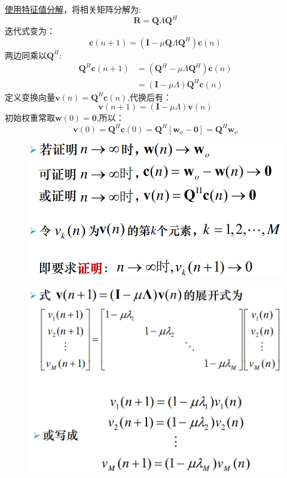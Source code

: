 \documentclass[UTF8]{ctexart} %
\begin{document}
			\uline{使用特征值分解}，将相关矩阵分解为:
			\[\textbf{R} = \textbf{Q}\Lambda\textbf{Q}^H\]
			迭代式变为：
			\[\textbf{c}(n+1) = (\textbf{I}-\mu\textbf{Q}\Lambda\textbf{Q}^H)\textbf{c}(n)\]
			两边同乘以$\textbf{Q}^H$:
			\[\begin{aligned}
			\textbf{Q}^H\textbf{c}(n+1) &= (\textbf{Q}^H-\mu\Lambda\textbf{Q}^H)\textbf{c}(n)\\
			&=(\textbf{I}-\mu\Lambda)\textbf{Q}^H\textbf{c}(n)
			\end{aligned}\]
			定义变换向量$\textbf{v}(n)=\textbf{Q}^H\textbf{c}(n)$,代换后有：
			\[\textbf{v}(n+1) = (\textbf{I}-\mu\Lambda)\textbf{v}(n)\]
			初始权重常取$\textbf{w}(0) = \textbf{0}$,所以：
			\[\textbf{v}(0) = \textbf{Q}^H\textbf{c}(0) = \textbf{Q}^H[\textbf{w}_o-\textbf{0}] = \textbf{Q}^H\textbf{w}_o\]
			\begin{figure}[H]
				\centering\includegraphics[scale=0.3]{18.png}
			\end{figure}
			\begin{figure}[H]
				\centering\includegraphics[scale=0.3]{19.png}
			\end{figure}
\end{document}
